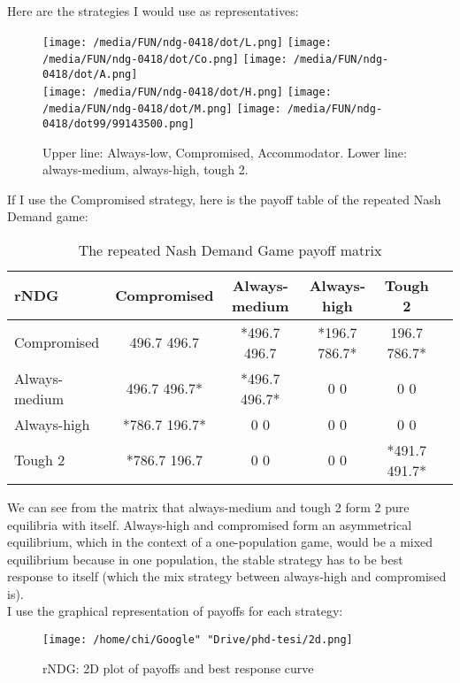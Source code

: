 \documentclass[12.5pt]{report}
\begin{document}
Here are the strategies I would use as representatives:

\begin{figure}
\center
\texttt{[image: /media/FUN/ndg-0418/dot/L.png]}
\texttt{[image: /media/FUN/ndg-0418/dot/Co.png]}
\texttt{[image: /media/FUN/ndg-0418/dot/A.png]}\\
\texttt{[image: /media/FUN/ndg-0418/dot/H.png]}
\texttt{[image: /media/FUN/ndg-0418/dot/M.png]}
\texttt{[image: /media/FUN/ndg-0418/dot99/99143500.png]}
\caption{Upper line: Always-low, Compromised, Accommodator. Lower line: always-medium, always-high, tough 2.}
\end{figure}

If I use the Compromised strategy, here is the payoff table of the repeated Nash Demand game:

\begin{table}
\center
\begin{tabular}{l|ccccc}
\textbf{rNDG}&Compromised& Always-medium & Always-high & Tough 2\\
\hline
Compromised & 496.7 496.7 &  *496.7 496.7 &  *196.7 786.7* &  196.7 786.7* \\
Always-medium &  496.7 496.7* & *496.7 496.7*  &     0 0    &        0 0   \\
Always-high &  *786.7 196.7*   &    0 0     &       0 0     &       0 0      \\
Tough 2 & *786.7 196.7  &      0 0     &       0 0    &   *491.7 491.7*\\
\end{tabular}
\caption{The repeated Nash Demand Game payoff matrix}
\end{table}

We can see from the matrix that always-medium and tough 2 form 2 pure equilibria with itself. Always-high and compromised form an asymmetrical equilibrium, which in the context of a one-population game, would be a mixed equilibrium because in one population, the stable strategy has to be best response to itself (which the mix strategy between always-high and compromised is).\\

I use the graphical representation of payoffs for each strategy:

\begin{figure}[h!]
\texttt{[image: /home/chi/Google" "Drive/phd-tesi/2d.png]}
\caption{rNDG: 2D plot of payoffs and best response curve}
\end{figure}
\end{document}

